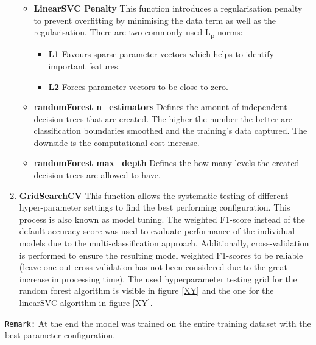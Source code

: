 \begin{enumerate}
\begin{itemize}
        \item \textbf{LinearSVC Penalty} This function introduces a regularisation penalty to prevent overfitting by minimising the data term as well as the regularisation. There are two commonly used L\textsubscript{p}-norms:
        \begin{itemize}
            \item \textbf{L1} Favours sparse parameter vectors which helps to identify important features.
            \item \textbf{L2} Forces parameter vectors to be close to zero.
        \end{itemize}
        
        \item \textbf{randomForest n\_estimators} Defines the amount of independent decision trees that are created. The higher the number the better are classification boundaries smoothed and the training's data captured. The downside is the computational cost increase.
        
        \item \textbf{randomForest max\_depth} Defines the how many levels the created decision trees are allowed to have.
        \end{itemize}
    
    \item \textbf{GridSearchCV} This function allows the systematic testing of different hyper-parameter settings to find the best performing configuration. This process is also known as model tuning. The weighted F1-score instead of the default accuracy score was used to evaluate performance of the individual models due to the multi-classification approach. Additionally, cross-validation is performed to ensure the resulting model weighted F1-scores to be reliable (leave one out cross-validation has not been considered due to the great increase in processing time). The used hyperparameter testing grid for the random forest algorithm is visible in figure \ref{XY} and the one for the linearSVC algorithm in figure \ref{XY}.
\end{enumerate}

\texttt{Remark:} At the end the model was trained on the entire training dataset with the best parameter configuration.\\

